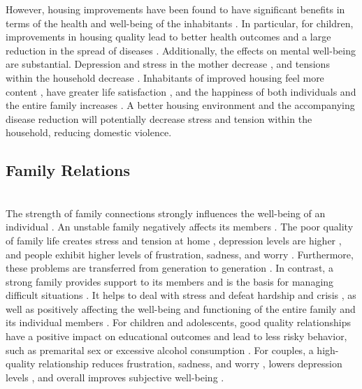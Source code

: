         However, housing improvements have been found to have significant benefits in terms of the health and well-being of the inhabitants \cite{cattaneo2009housing, jaitman_evaluation_2013}. In particular, for children, improvements in housing quality lead to better health outcomes and a large reduction in the spread of diseases \cite{cattaneo2009housing,galiani2017shelter, jaitman_evaluation_2013}. Additionally, the effects on mental well-being are substantial. Depression and stress in the mother decrease \cite{cattaneo2009housing}, and tensions within the household decrease \cite{devoto2012happiness}. Inhabitants of improved housing feel more content \cite{cattaneo2009housing}, have greater life satisfaction \cite{jaitman_evaluation_2013}, and the happiness of both individuals and the entire family increases \cite{devoto2012happiness, galiani2017shelter}. A better housing environment and the accompanying disease reduction will potentially decrease stress and tension within the household, reducing domestic violence.   \\
        
    \subsection{Family Relations} \\

        The strength of family connections strongly influences the well-being of an individual \cite{thomas_family_2017}. An unstable family negatively affects its members \cite{schoon_competence_2002}. The poor quality of family life creates stress and tension at home \cite{thomas_family_2017}, depression levels are higher \cite{jurinsky_ease_2022}, and people exhibit higher levels of frustration, sadness, and worry \cite{carr_marital_2016}. Furthermore, these problems are transferred from generation to generation \cite{defrain_strong_2007}. In contrast, a strong family provides support to its members \cite{defrain_strong_2007} and is the basis for managing difficult situations \cite{gopalakrishnan_longitudinal_2023}. It helps to deal with stress and defeat hardship and crisis \cite{clark_spirituality_2017}, as well as positively affecting the well-being and functioning of the entire family and its individual members \cite{dunst_meta-analytic_2021}. For children and adolescents, good quality relationships have a positive impact on educational outcomes \cite{stevens_developmental_2018} and lead to less risky behavior, such as premarital sex \cite{roche_enduring_2008} or excessive alcohol consumption \cite{goldberg-looney_adolescent_2015}. For couples, a high-quality relationship reduces frustration, sadness, and worry \cite{carr_marital_2016}, lowers depression levels \cite{gopalakrishnan_longitudinal_2023}, and overall improves subjective well-being \cite{dush_consequences_2005}.  \\
        

